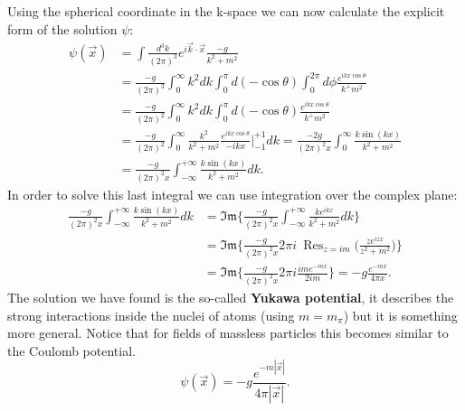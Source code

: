 Using the spherical coordinate in the k-space we can now calculate the explicit form of the solution $\psi$:
\begin{align*}
    \psi(\vec x)&=\int\frac{d^3k}{(2\pi)^3}e^{i\vec k\cdot \vec x } \frac{-g}{k^2+m^2}\\&=\frac{-g}{(2\pi)^3}\int_{0}^{\infty}k^2dk\int_{0}^{\pi}d(-\cos\theta)\int_{0}^{2\pi}d\phi\frac{e^{ikx\cos\theta}}{k^+m^2}\\&=\frac{-g}{(2\pi)^2}\int_{0}^{\infty}k^2dk\int_{0}^{\pi}d(-\cos\theta)\frac{e^{ikx\cos\theta}}{k^+m^2}\\&=\frac{-g}{(2\pi)^2}\int_{0}^{\infty}\frac{k^2}{k^2+m^2}\frac{e^{ikx\cos\theta}}{-ikx}\bigg|_{-1}^{+1}dk=\frac{-2g}{(2\pi)^2x}\int_{0}^{\infty}\frac{k\sin(kx)}{k^2+m^2}\\&=\frac{-g}{(2\pi)^2x}\int_{-\infty}^{+\infty}\frac{k\sin(kx)}{k^2+m^2}dk.
\end{align*}
In order to solve this last integral we can use integration over the complex plane:
\begin{align*}
    \frac{-g}{(2\pi)^2x}\int_{-\infty}^{+\infty}\frac{k\sin(kx)}{k^2+m^2}dk&=\mathfrak{Im}\bigg\{ \frac{-g}{(2\pi)^2x}\int_{-\infty}^{+\infty}\frac{ke^{ikx}}{k^2+m^2}dk\bigg\}\\&=\mathfrak{Im}\bigg\{ \frac{-g}{(2\pi)^2x}2\pi i\ \mathop{\mathrm{Res}}_{z = im}\biggl(\frac{ze^{izx}}{z^2+m^2}\biggr)\bigg\}\\&=\mathfrak{Im}\bigg\{ \frac{-g}{(2\pi)^2x}2\pi i\frac{ime^{-mx}}{2im}\bigg\}=-g\frac{e^{-mx}}{4\pi x}.
\end{align*}
The solution we have found is the so-called \textbf{Yukawa potential}, it describes the strong interactions inside the nuclei of atoms (using $m=m_\pi$) but it is something more general. Notice that for fields of massless particles this becomes similar to the Coulomb potential.
\begin{equation}\label{YukawaPot}
    \psi(\vec x)=-g\frac{e^{-m|\vec x|}}{4\pi |\vec x|}.
\end{equation}
